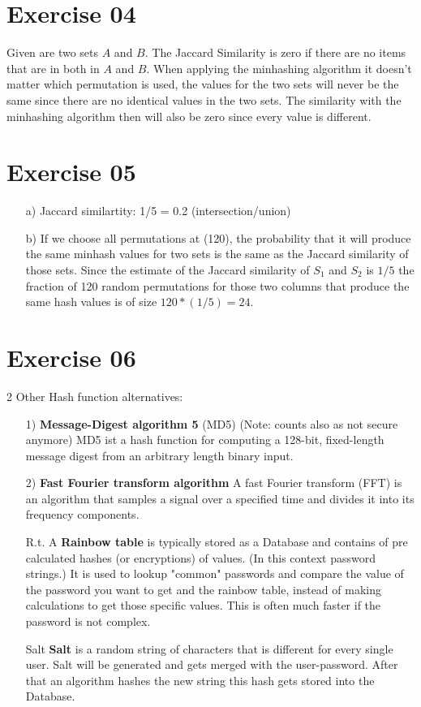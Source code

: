 \documentclass[11pt,a4paper]{scrartcl}
\begin{document}
\section*{Exercise 04}

Given are two sets $A$ and $B$. The Jaccard Similarity is zero if there are no items that are in both in $A$ and $B$. When applying the minhashing algorithm it doesn't matter which permutation is used, the values for the two sets will never be the same since there are no identical values in the two sets. The similarity with the minhashing algorithm then will also be zero since every value is different.

\section*{Exercise 05}
\begin{itemize}
\item [a)] Jaccard similartity: 1/5 = 0.2 (intersection/union)
\item [b)] 
If we choose all permutations at (120), the probability that it will produce the same minhash values for two sets is the same as the Jaccard similarity of those sets. Since the estimate of the Jaccard similarity of $S_1$ and $S_2$ is $1/5$ the fraction of 120 random permutations for those two columns that produce the same hash values is of size $120 * (1/5) = 24$.
\end{itemize}

\section*{Exercise 06}
2 Other Hash function alternatives:
\begin{itemize}
\item [1)] \textbf{Message-Digest algorithm 5} (MD5) (Note: counts also as not secure anymore)
		MD5 ist a hash function for computing a 128-bit, fixed-length message digest from an arbitrary length binary input.
\item [2)] \textbf{Fast Fourier transform algorithm}
		A fast Fourier transform (FFT) is an algorithm that samples a signal over a specified time and divides it into its frequency components.
\item [R.t.] A \textbf{Rainbow table} is typically stored as a Database and contains of pre calculated hashes (or encryptions) of values. (In this context password strings.) It is used to lookup "common" passwords and compare the value of the password you want to get and the rainbow table, instead of making calculations to get those specific values. This is often much faster if the password is not complex.
\item [Salt] \textbf{Salt} is a random string of characters that is different for every single user. Salt will be generated and gets merged with the user-password. After that an algorithm hashes the new string this hash gets stored into the Database.
\end{itemize}
\end{document}
